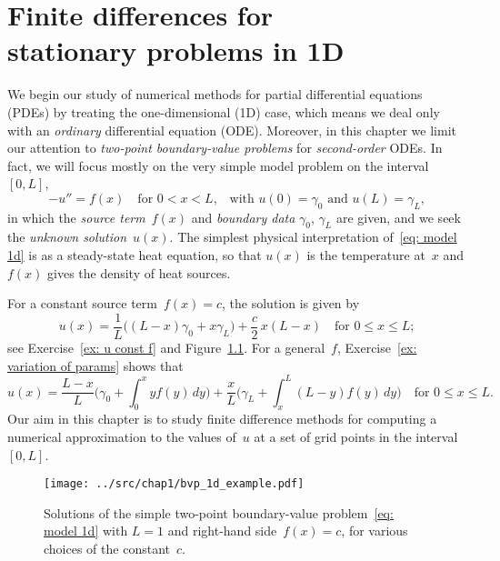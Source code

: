 \chapter[Finite differences in 1D]{Finite differences for \\ 
stationary problems in 1D}
\label{chap: finite diff 1d}
We begin our study of numerical methods for partial differential equations 
(PDEs) by treating the one-dimensional (1D) case, which means we deal only with 
an \emph{ordinary} differential equation (ODE).  Moreover, in this chapter we 
limit our attention to \emph{two-point boundary-value problems} for 
\emph{second-order} ODEs.  In fact, we will focus mostly on the very simple 
model problem on the interval~$[0,L]$,
\begin{equation}\label{eq: model 1d}
-u''=f(x)\quad\text{for $0<x<L$,}
	\quad\text{with $u(0)=\gamma_0$ and $u(L)=\gamma_L$,}
\end{equation}
in which the \emph{source term}~$f(x)$ and \emph{boundary data} $\gamma_0$, 
$\gamma_L$ are given, and we seek the \emph{unknown solution}~$u(x)$.  The 
simplest physical interpretation of~\eqref{eq: model 1d} is as a steady-state 
heat equation, so that $u(x)$ is the temperature at~$x$ and $f(x)$ gives the 
density of heat sources.

For a constant source term~$f(x)=c$, the solution is given by
\begin{equation}\label{eq: u const f}
u(x)=\frac{1}{L}\bigl((L-x)\gamma_0+x\gamma_L\bigr)+\frac{c}{2}\,x(L-x)
	\quad\text{for $0\le x\le L$;}
\end{equation}
see Exercise~\ref{ex: u const f} and Figure~\ref{fig: bvp 1d f const}. For a 
general~$f$, Exercise~\ref{ex: variation of params} shows that
\begin{equation}\label{eq: model 1d exact soln}
u(x)=\frac{L-x}{L}\biggl(\gamma_0+\int_0^x yf(y)\,dy\biggr)
	+\frac{x}{L}\biggl(\gamma_L+\int_x^L(L-y)f(y)\,dy\biggr)
	\quad\text{for $0\le x\le L$.}
\end{equation}
Our aim in this chapter is to study finite difference methods for computing 
a numerical approximation to the values of~$u$ at a set of grid points in the 
interval~$[0,L]$.

\begin{figure}
\caption{Solutions of the simple two-point boundary-value 
problem~\eqref{eq: model 1d} with $L=1$ and right-hand side~$f(x)=c$, for 
various choices of the constant~$c$.}\label{fig: bvp 1d f const}
\begin{center}
\texttt{[image: ../src/chap1/bvp\_1d\_example.pdf]}
\end{center}
\end{figure}


